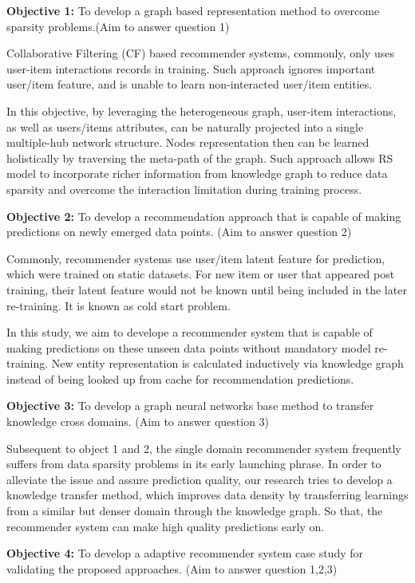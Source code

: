 \bigskip
\textbf{Objective 1:} To develop a graph based representation method to overcome sparsity problems.(Aim to answer question 1)

Collaborative Filtering (CF) based recommender systems, commonly, only uses user-item interactions records in training. Such approach ignores important user/item feature, and is unable to learn non-interacted user/item entities. 

In this objective, by leveraging the heterogeneous graph, user-item interactions, as well as users/items attributes, can be naturally projected into a single multiple-hub network \citep{Shi2017} structure. Nodes representation then can be learned holistically by traversing the meta-path of the graph. Such approach allows RS model to incorporate richer information from knowledge graph to reduce data sparsity and overcome the interaction limitation during training process.


\bigskip
\textbf{Objective 2:} To develop a recommendation approach that is capable of making predictions on newly emerged data points. (Aim to answer question 2)

Commonly, recommender systems use user/item latent feature for prediction, which were trained on static datasets. For new item or user that appeared post training, their latent feature would not be known until being included in the later re-training. It is known as cold start problem.

In this study, we aim to develope a recommender system that is capable of making predictions on these unseen data points without mandatory model re-training. New entity representation is calculated inductively via knowledge graph instead of being looked up from cache for recommendation predictions.


\bigskip
\textbf{Objective 3:} To develop a graph neural networks base method to transfer knowledge cross domains. (Aim to answer question 3)

Subsequent to object 1 and 2, the single domain recommender system frequently suffers from data sparsity problems in its early launching phrase. In order to alleviate the issue and assure prediction quality, our research tries to develop a knowledge transfer method, which improves data density by transferring learnings from a similar but denser domain through the knowledge graph. So that, the recommender system can make high quality predictions early on.

\bigskip
\textbf{Objective 4:} To develop a adaptive recommender system case study for validating the proposed approaches. (Aim to answer question 1,2,3)

